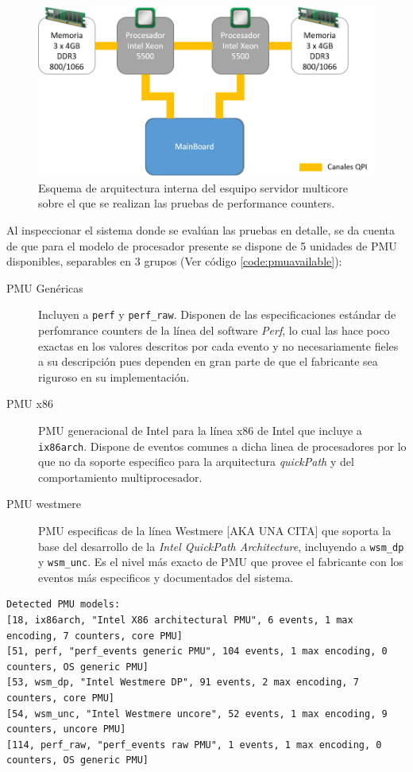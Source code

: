 \begin{figure}[!h]
	\centering
	\includegraphics[scale=.7]{imagenes/arch24Cores.png}
	\caption{Esquema de arquitectura interna del esquipo servidor multicore sobre el que se realizan las pruebas de performance counters.}
	\label{fig:hwspecs}
\end{figure}

Al inspeccionar el sistema donde se evalúan las pruebas en detalle, se da cuenta de que para el modelo de procesador presente se dispone de 5 unidades de PMU disponibles, separables en 3 grupos (Ver código \ref{code:pmuavailable}):
\begin{description}
\item[PMU Genéricas] Incluyen a \verb=perf= y  \verb=perf_raw=. Disponen de las especificaciones estándar de perfomrance counters de la línea del software \emph{Perf}, lo cual las hace poco exactas en los valores descritos por cada evento y no necesariamente fieles a su descripción pues dependen en gran parte de que el fabricante sea riguroso en su implementación.
\item[PMU x86] PMU generacional de Intel para la línea x86 de Intel que incluye a \verb=ix86arch=. Dispone de eventos comunes a dicha linea de procesadores por lo que no da soporte especifico para la arquitectura \emph{quickPath} y del comportamiento multiprocesador.
\item[PMU westmere] PMU especificas de la línea Westmere [AKA UNA CITA] que soporta la base del desarrollo de la \emph{Intel QuickPath Architecture}, incluyendo a \verb=wsm_dp= y \verb=wsm_unc=. Es el nivel más exacto de PMU que provee el fabricante con los eventos más especificos y documentados del sistema.
\end{description}

\begin{lstlisting}[style=BashInputStyle, label={code:pmuavailable}, caption={Listado de \emph{PMUs} disponibles en el sistema, recuperado con la herramienta \emph{libpfm4}.}, captionpos=b]
	Detected PMU models:
[18, ix86arch, "Intel X86 architectural PMU", 6 events, 1 max encoding, 7 counters, core PMU]
[51, perf, "perf_events generic PMU", 104 events, 1 max encoding, 0 counters, OS generic PMU]
[53, wsm_dp, "Intel Westmere DP", 91 events, 2 max encoding, 7 counters, core PMU]
[54, wsm_unc, "Intel Westmere uncore", 52 events, 1 max encoding, 9 counters, uncore PMU]
[114, perf_raw, "perf_events raw PMU", 1 events, 1 max encoding, 0 counters, OS generic PMU]
\end{lstlisting}

